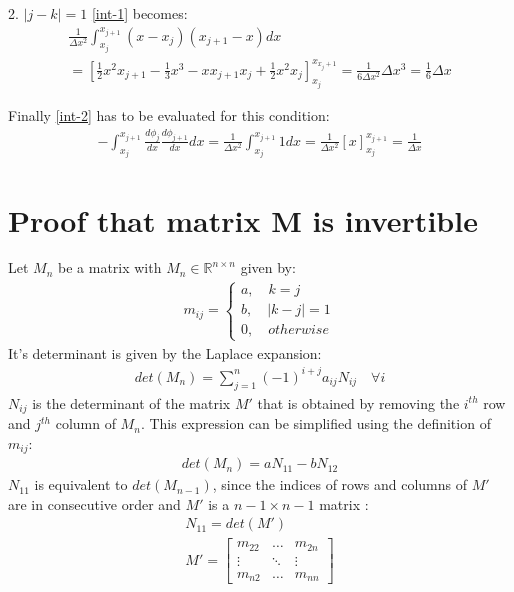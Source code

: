 2. \(|j - k| = 1\)
\ref{int-1} becomes:
\begin{gather}
\frac{1}{\Delta x^2} \int_{x_j}^{x_{j+1}} (x-x_j)(x_{j+1} - x)dx \\
= \left[ \frac{1}{2} x^2 x_{j+1} - \frac{1}{3} x^3 - x x_{j+1} x_{j} + \frac{1}{2} x^2 x_j \right]_{x_j}^{x_{x_j+1}} 
= \frac{1}{6 \Delta x^2} \Delta x^3 = \frac{1}{6} \Delta x
\end{gather}
 
Finally \ref{int-2} has to be evaluated for this condition:
\begin{gather}
-\int_{x_j}^{x_{j+1}} \frac{d\phi_{j}}{dx}\frac{d\phi_{j+1}}{dx}dx = \frac{1}{\Delta x^2} \int_{x_j}^{x_{j+1}} 1 dx =  \frac{1}{\Delta x^2} \left[ x \right]_{x_{j}}^{x_{j+1}} = \frac{1}{\Delta x}
\end{gather}
\newpage
\section{Proof that matrix M is invertible}
\label{ap-K-inv}
Let \(M_{n}\) be a matrix with \(M_{n} \in \mathbb{R}^{n \times n}\) given by:
\begin{gather}
m_{ij} = \begin{cases}
a, \quad k = j \\
b, \quad |k - j| = 1 \\
0, \quad otherwise 
\end{cases}
\end{gather}
It's determinant is given by the Laplace expansion:
\begin{gather}
det(M_n) = \sum_{j=1}^{n} (-1)^{i+j} a_{ij} N_{ij} \quad \forall i
\end{gather}
\(N_{ij}\) is the determinant of the matrix \(M'\) that is obtained by removing the \(i^{th}\) row and \(j^{th}\) column of \(M_n\).
This expression can be simplified using the definition of \(m_{ij}\):
\begin{gather}
det(M_n) = a N_{11} - b N_{12} \label{1}
\end{gather}
\(N_{11}\) is equivalent to \(det(M_{n-1})\), since the indices of rows and columns of \(M'\) are in consecutive order and \(M'\) is a \(n-1 \times n-1\) matrix :
\begin{gather}
N_{11} = det(M') \\
M' = \begin{bmatrix}
m_{22} & \dots & m_{2n}\\
\vdots & \ddots & \vdots \\
m_{n2} & \dots & m_{nn}
\end{bmatrix}
\end{gather}
